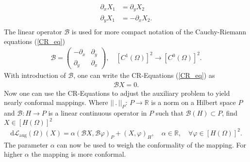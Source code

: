 \begin{equation}\label{CR_eq}
	\begin{aligned}
		\partial_x X_1 &= \partial_y X_2 \\
		\partial_y X_1 &= -\partial_x X_2. \\
	\end{aligned}
\end{equation}
The linear operator $\mathcal{B}$ is used for more compact notation of the 
Cauchy-Riemann equations (\ref{CR_eq})
\begin{equation}\label{CR_B}
	\begin{aligned}
		\mathcal{B} = 
		\begin{pmatrix}
			-\partial_x & \partial_y\\
			\partial_y & \partial_x
		\end{pmatrix} ,\quad [C^1(\Omega)]^2 \rightarrow [C^0(\Omega)]^2.
	\end{aligned}
\end{equation}
With introduction of $\mathcal{B}$, one can write the CR-Equations (\ref{CR_eq}) as
\begin{align*}
	\mathcal{B}X=0.
\end{align*}
Now one can use the CR-Equations to adjust the auxiliary problem to yield nearly conformal 
mappings. Where $|| \, . \, ||_P: \, P \rightarrow \mathbb{R}$ is a
norm on a Hilbert space $P$ and $\mathcal{B}:H \rightarrow P$ is a linear continuous operator 
in $P$  such that $\mathcal{B}(H) \subset P$, find $X \in [H(\Omega)]^2$
\begin{align}\label{eq_conf_aux}
	\mathrm{d}\mathcal{L}_{\mathrm{aug}}(\Omega)(X) = \alpha (\mathcal{B}X,\mathcal{B}\varphi)_P
	+ (X,\varphi)_H, \quad \alpha \in \mathbb{R}, \quad \forall \varphi \in [H(\Omega)]^2.
\end{align}
The parameter $\alpha$ can now be used to weigh the conformality of the mapping. For higher 
$\alpha$ the mapping is more conformal.


